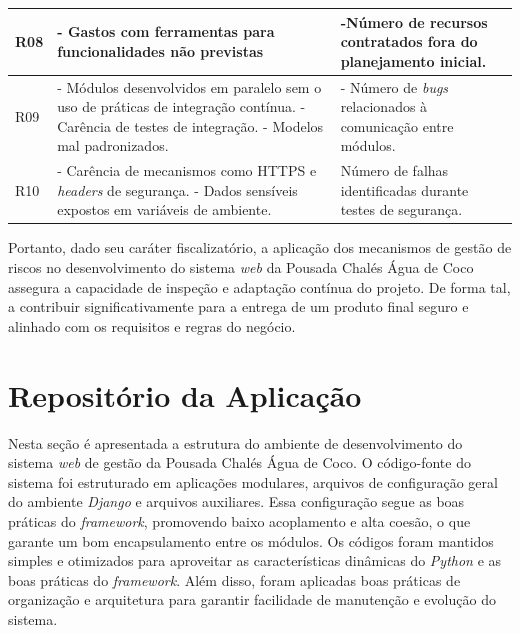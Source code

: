 \documentclass[
	12pt,				%
	openany,			%
	twoside,			%
	a4paper,			%
	english,			%
	french,				%
	spanish,			%
	brazil				%
	]{abntex2}
\begin{document}
\begin{quadro}[H]
\begin{tabular} {|p{3cm}|p{6cm}|p{6cm}|}
		\\
		\hline
		R08 & 
		- Gastos com ferramentas para funcionalidades não previstas
		& -Número de recursos contratados fora do planejamento inicial.
		\\
		\hline
		R09 & 
		- Módulos desenvolvidos em paralelo sem o uso de práticas de integração contínua. \newline
		- Carência de testes de integração. \newline
		- Modelos mal padronizados.
		& - Número de \textit{bugs} relacionados à comunicação entre módulos.
		\\
		\hline
		R10 & 
		- Carência de mecanismos como HTTPS e \textit{headers} de segurança. \newline
		- Dados sensíveis expostos em variáveis de ambiente.
		& Número de falhas identificadas durante testes de segurança.
		\\ \hline
	\end{tabular}
\end{quadro}
Portanto, dado seu caráter fiscalizatório, a aplicação dos mecanismos de  gestão de riscos no desenvolvimento do sistema \textit{web} da Pousada Chalés Água de Coco assegura a capacidade de inspeção e adaptação contínua do projeto. De forma tal, a contribuir significativamente para a entrega de um produto final seguro e alinhado com os requisitos e regras do negócio. 
\section{Repositório da Aplicação}Nesta seção é apresentada a estrutura do ambiente de desenvolvimento do sistema \textit{web} de gestão da Pousada Chalés Água de Coco. O código-fonte do sistema foi estruturado em aplicações modulares, arquivos de configuração geral do ambiente \textit{Django} e arquivos auxiliares. Essa configuração segue as boas práticas do \textit{framework}, promovendo baixo acoplamento e alta coesão, o que garante um bom encapsulamento entre os módulos. Os códigos foram mantidos simples e otimizados para aproveitar as características dinâmicas do \textit{Python} e as boas práticas do \textit{framework}. Além disso, foram aplicadas boas práticas de organização e arquitetura para garantir facilidade de manutenção e evolução do sistema.
\end{document}
